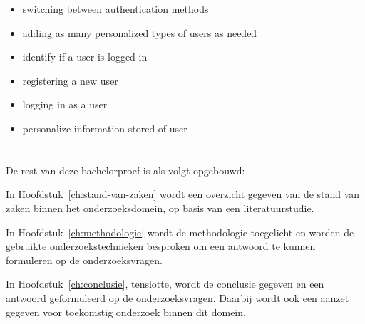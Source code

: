 \begin{itemize}
    \item switching between authentication methods
    \item adding as many personalized types of users as needed
    \item identify if a user is logged in
    \item registering a new user
    \item logging in as a user
    \item personalize information stored of user
\end{itemize}

\section{}%
\label{sec:opzet-bachelorproef}



De rest van deze bachelorproef is als volgt opgebouwd:

In Hoofdstuk~\ref{ch:stand-van-zaken} wordt een overzicht gegeven van de stand van zaken binnen het onderzoeksdomein, op basis van een literatuurstudie.

In Hoofdstuk~\ref{ch:methodologie} wordt de methodologie toegelicht en worden de gebruikte onderzoekstechnieken besproken om een antwoord te kunnen formuleren op de onderzoeksvragen.


In Hoofdstuk~\ref{ch:conclusie}, tenslotte, wordt de conclusie gegeven en een antwoord geformuleerd op de onderzoeksvragen. Daarbij wordt ook een aanzet gegeven voor toekomstig onderzoek binnen dit domein.